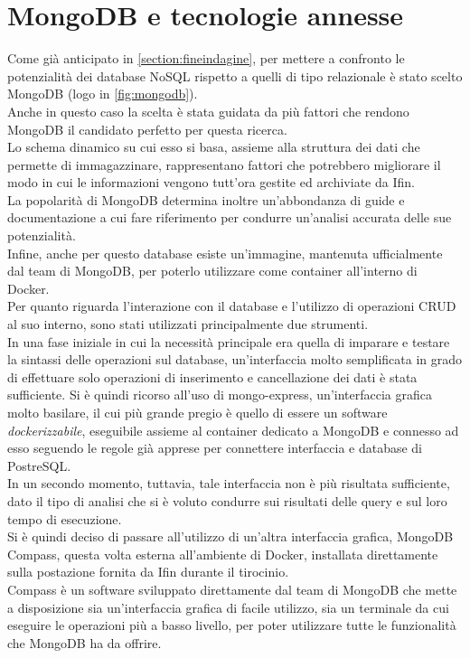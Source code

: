 \section{MongoDB e tecnologie annesse}
Come già anticipato in \autoref{section:fineindagine}, per mettere a confronto le potenzialità dei database NoSQL rispetto a quelli di tipo relazionale è stato scelto MongoDB (logo in \autoref{fig:mongodb}).\\
Anche in questo caso la scelta è stata guidata da più fattori che rendono MongoDB il candidato perfetto per questa ricerca.\\
Lo schema dinamico su cui esso si basa, assieme alla struttura dei dati che permette di immagazzinare, rappresentano fattori che potrebbero migliorare il modo in cui le informazioni vengono tutt'ora gestite ed archiviate da Ifin.\\
La popolarità di MongoDB determina inoltre un'abbondanza di guide e documentazione a cui fare riferimento per condurre un'analisi accurata delle sue potenzialità.\\
Infine, anche per questo database esiste un'immagine, mantenuta ufficialmente dal team di MongoDB, per poterlo utilizzare come container all'interno di Docker.\\

\noindent Per quanto riguarda l'interazione con il database e l'utilizzo di \gls{operazioni CRUD} al suo interno, sono stati utilizzati principalmente due strumenti.\\ 
In una fase iniziale in cui la necessità principale era quella di imparare e testare la sintassi delle operazioni sul database, un'interfaccia molto semplificata in grado di effettuare solo operazioni di inserimento e cancellazione dei dati è stata sufficiente. Si è quindi ricorso all'uso di mongo-express, un'interfaccia grafica molto basilare, il cui più grande pregio è quello di essere un software \textit{dockerizzabile}, eseguibile assieme al container dedicato a MongoDB e connesso ad esso seguendo le regole già apprese per connettere interfaccia e database di PostreSQL.\\
In un secondo momento, tuttavia, tale interfaccia non è più risultata sufficiente, dato il tipo di analisi che si è voluto condurre sui risultati delle query e sul loro tempo di esecuzione.\\
Si è quindi deciso di passare all'utilizzo di un'altra interfaccia grafica, MongoDB Compass, questa volta esterna all'ambiente di Docker, installata direttamente sulla postazione fornita da Ifin durante il tirocinio.\\
Compass è un software sviluppato direttamente dal team di MongoDB che mette a disposizione sia un'interfaccia grafica di facile utilizzo, sia un terminale da cui eseguire le operazioni più a basso livello, per poter utilizzare tutte le funzionalità che MongoDB ha da offrire.

